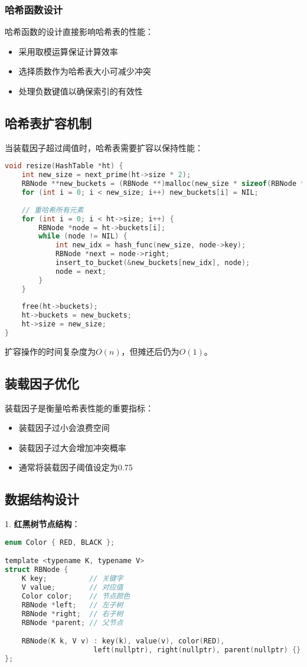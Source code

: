 \documentclass[12pt,a4paper]{article}
\begin{document}
\subsubsection{哈希函数设计}
哈希函数的设计直接影响哈希表的性能：
\begin{itemize}
\item 采用取模运算保证计算效率
\item 选择质数作为哈希表大小可减少冲突
\item 处理负数键值以确保索引的有效性
\end{itemize}

\subsection{哈希表扩容机制}
当装载因子超过阈值时，哈希表需要扩容以保持性能：

\begin{lstlisting}[language=C,caption=哈希表扩容实现]
void resize(HashTable *ht) {
    int new_size = next_prime(ht->size * 2);
    RBNode **new_buckets = (RBNode **)malloc(new_size * sizeof(RBNode *));
    for (int i = 0; i < new_size; i++) new_buckets[i] = NIL;
    
    // 重哈希所有元素
    for (int i = 0; i < ht->size; i++) {
        RBNode *node = ht->buckets[i];
        while (node != NIL) {
            int new_idx = hash_func(new_size, node->key);
            RBNode *next = node->right;
            insert_to_bucket(&new_buckets[new_idx], node);
            node = next;
        }
    }
    
    free(ht->buckets);
    ht->buckets = new_buckets;
    ht->size = new_size;
}
\end{lstlisting}

扩容操作的时间复杂度为$O(n)$，但摊还后仍为$O(1)$。

\subsection{装载因子优化}
装载因子是衡量哈希表性能的重要指标：
\begin{itemize}
\item 装载因子过小会浪费空间
\item 装载因子过大会增加冲突概率
\item 通常将装载因子阈值设定为0.75
\end{itemize}
\subsection{数据结构设计}
1. \textbf{红黑树节点结构}：
\begin{lstlisting}[language=C,caption=红黑树节点结构]
enum Color { RED, BLACK };

template <typename K, typename V>
struct RBNode {
    K key;          // 关键字
    V value;        // 对应值
    Color color;    // 节点颜色
    RBNode *left;   // 左子树
    RBNode *right;  // 右子树
    RBNode *parent; // 父节点

    RBNode(K k, V v) : key(k), value(v), color(RED),
                     left(nullptr), right(nullptr), parent(nullptr) {}
};
\end{lstlisting}
\end{document}
